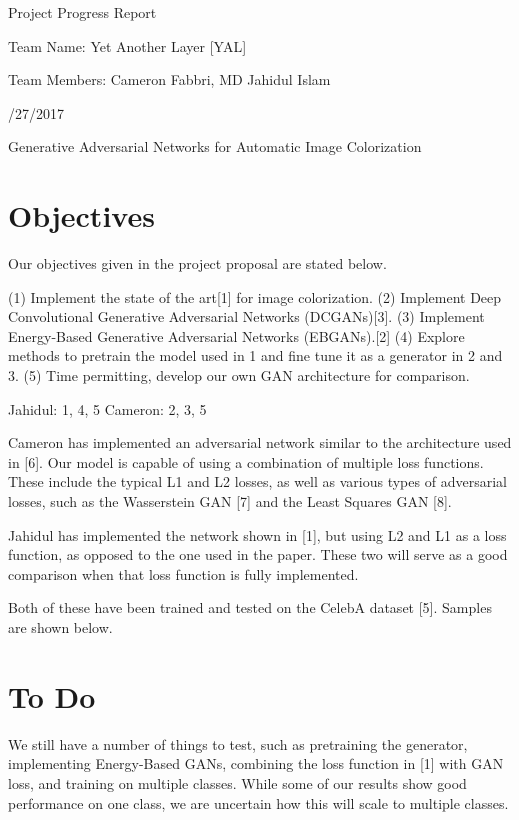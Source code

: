 \documentclass{article}
\begin{document}
\centerline{\sc \large Project Progress Report}
\vspace{.5pc}
\centerline{\sc Team Name: Yet Another Layer [YAL]}
\centerline{\sc Team Members: Cameron Fabbri, MD Jahidul Islam}
\centerline{/27/2017}
\vspace{2pc}

\centerline{\sc \large Generative Adversarial Networks for Automatic Image Colorization }

\section{Objectives}
Our objectives given in the project proposal are stated below. 

\noindent (1) Implement the state of the art[1] for image colorization. \newline
\noindent (2) Implement Deep Convolutional Generative Adversarial Networks (DCGANs)[3]. \newline
\noindent (3) Implement Energy-Based Generative Adversarial Networks (EBGANs).[2] \newline
\noindent (4) Explore methods to pretrain the model used in 1 and fine tune it as a generator in 2 and 3.
\newline
\noindent (5) Time permitting, develop our own GAN architecture for comparison. \newline

\noindent Jahidul: 1, 4, 5 \newline
\noindent Cameron: 2, 3, 5 \newline

\noindent Cameron has implemented an adversarial network similar to the architecture used in [6]. Our model
is capable of using a combination of multiple loss functions. These include the typical L1 and L2 losses,
as well as various types of adversarial losses, such as the Wasserstein GAN [7] and the Least Squares GAN
[8]. 
\vspace{1pc}

\noindent Jahidul has implemented the network shown in [1], but using L2 and L1 as a loss function, as
opposed to the one used in the paper. These two will serve as a good comparison when that loss function is
fully implemented.
\vspace{1pc}

\noindent Both of these have been trained and tested on the CelebA dataset [5]. Samples are shown below.

\section{To Do}
We still have a number of things to test, such as pretraining the generator, implementing Energy-Based GANs,
combining the loss function in [1] with GAN loss, and training on multiple classes. While some of our results
show good performance on one class, we are uncertain how this will scale to multiple classes.
\end{document}
